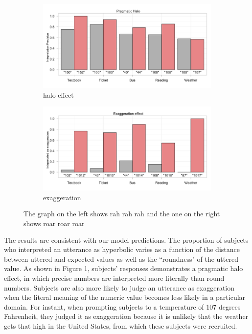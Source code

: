 \documentclass{article} %
\begin{document}
\begin{figure}
        \begin{subfigure}[b]{0.5\textwidth}
                \centering
		\includegraphics[width=\textwidth]{humans_halo.png}
		\caption{halo effect}
	\end{subfigure}
        \begin{subfigure}[b]{0.5\textwidth}
                \centering
                \includegraphics[width=\textwidth]{humans_exagg.png}
		\caption{exaggeration}
	\end{subfigure}
	\caption{The graph on the left shows rah rah rah and the one on the right shows roar roar roar}
\end{figure}

The results are consistent with our model predictions. The proportion of subjects who interpreted an utterance as hyperbolic varies as a function of the distance between uttered and expected values as well as the ``roundness" of the uttered value. 
As shown in Figure 1, subjects' responses demonstrates a pragmatic halo effect, in which precise numbers are interpreted more literally than round numbers. Subjects are also more likely to judge an utterance as exaggeration when the literal meaning of the numeric value becomes less likely in a particular domain. For instant, when prompting subjects to a temperature of 107 degrees Fahrenheit, they judged it as exaggeration because it is unlikely that the weather gets that high in the United States, from which these subjects were recruited.
\end{document}
